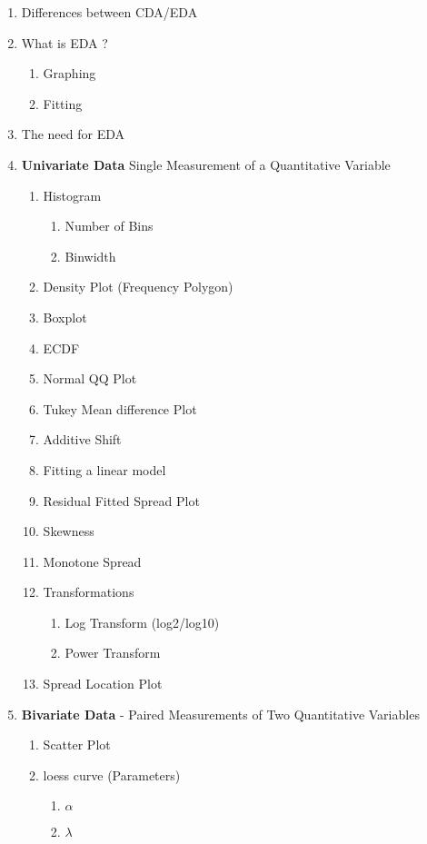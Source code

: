 \documentclass[11pt]{article}
\begin{document}
	\begin{enumerate}
		\item Differences between CDA/EDA
		\item What is EDA ?
		\begin{enumerate}
			\item Graphing
			\item Fitting
		\end{enumerate}
	    \item The need for EDA
		\item \textbf{Univariate Data} Single Measurement of a Quantitative Variable
		\begin{enumerate}
			\item Histogram
			\begin{enumerate}
				\item Number of Bins
				\item Binwidth
			\end{enumerate}
			\item Density Plot (Frequency Polygon)
			\item Boxplot
			\item ECDF
			\item Normal QQ Plot
			\item Tukey Mean difference Plot
			\item Additive Shift
			\item Fitting a linear model
			\item Residual Fitted Spread Plot
			\item Skewness
			\item Monotone Spread
			\item Transformations
			\begin{enumerate}
				\item Log Transform (log2/log10)
				\item Power Transform
			\end{enumerate}
		\item Spread Location Plot
		\end{enumerate}
	\item \textbf{Bivariate Data} - Paired Measurements of Two Quantitative Variables
	\begin{enumerate}
		\item Scatter Plot
		\item loess curve (Parameters)
		\begin{enumerate}
			\item $\alpha$
			\item $\lambda$
		\end{enumerate}
	\end{enumerate}
	\end{enumerate}
\newpage
\end{document}
